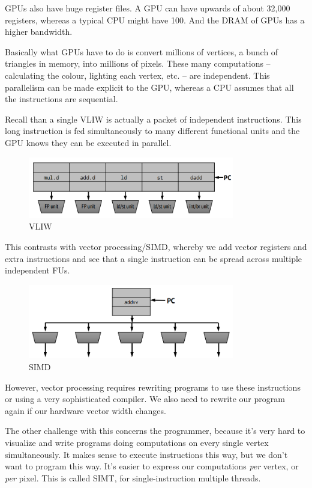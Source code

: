 \documentclass{article}
\begin{document}
GPUs also have huge register files. A GPU can have upwards of about 32,000 registers, whereas a typical CPU might have 100. And the DRAM of GPUs has a higher bandwidth. 


Basically what GPUs have to do is convert millions of vertices, a bunch of triangles in memory, into millions of pixels. These many computations -- calculating the colour, lighting each vertex, etc. --  are independent. This parallelism can be made explicit to the GPU, whereas a CPU assumes that all the instructions are sequential. 

Recall than a single VLIW is actually a packet of independent instructions. This long instruction is fed simultaneously to many different functional units and the GPU knows they can be executed in parallel. 

 \begin{figure}[ht!]
\centering
\includegraphics[width=90mm]{img/VLIW3.png}
\caption{VLIW}
\end{figure}

This contrasts with vector processing/SIMD, whereby we add vector registers and extra instructions and see that a single instruction can be spread across multiple independent FUs. 

 \begin{figure}[ht!]
\centering
\includegraphics[width=90mm]{img/SIMD3.png}
\caption{SIMD}
\end{figure}

However, vector processing requires rewriting programs to use these instructions or using a very sophisticated compiler. We also need to rewrite our program again if our hardware vector width changes. 

The other challenge with this concerns the programmer, because it's very hard to visualize and write programs doing computations on every single vertex simultaneously. It makes sense to execute instructions this way, but we don't want to program this way. It's easier to express our computations \textit{per} vertex, or \textit{per} pixel. This is called SIMT, for single-instruction multiple threads. 
\end{document}
